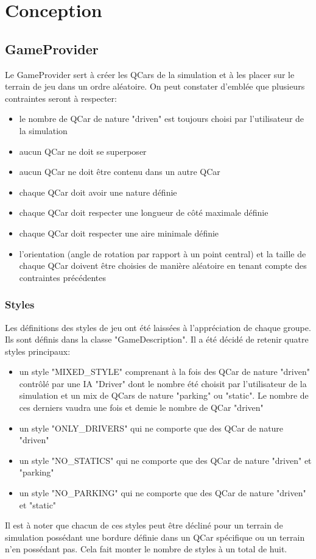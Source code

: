 \documentclass[a4paper, 12pt]{article}
\begin{document}
\section{Conception}
\subsection{GameProvider}
Le GameProvider sert à créer les QCars de la simulation et à les placer sur le terrain de jeu dans un ordre aléatoire. On peut constater d'emblée que plusieurs contraintes seront à respecter:
\begin{itemize}
 \item le nombre de QCar de nature "driven" est toujours choisi par l'utilisateur de la simulation
 \item aucun QCar ne doit se superposer
 \item aucun QCar ne doit être contenu dans un autre QCar
 \item chaque QCar doit avoir une nature définie
 \item chaque QCar doit respecter une longueur de côté maximale définie
 \item chaque QCar doit respecter une aire minimale définie
 \item l'orientation (angle de rotation par rapport à un point central) et la taille de chaque QCar doivent être choisies de manière aléatoire en tenant compte des contraintes précédentes
\end{itemize}

\subsubsection{Styles}
Les définitions des styles de jeu ont été laissées à l'appréciation de chaque groupe. Ils sont définis dans la classe "GameDescription". Il a été décidé de retenir quatre styles principaux:
\begin{itemize}
 \item un style "MIXED\_STYLE" comprenant à la fois des QCar de nature "driven" contrôlé par une IA "Driver" dont le nombre été choisit par l'utilisateur de la simulation et un mix de QCars de nature "parking" ou "static". Le nombre de ces derniers vaudra une fois et demie le nombre de QCar "driven"
 \item un style "ONLY\_DRIVERS" qui ne comporte que des QCar de nature "driven"
 \item un style "NO\_STATICS" qui ne comporte que des QCar de nature "driven" et "parking"
 \item un style "NO\_PARKING" qui ne comporte que des QCar de nature "driven" et "static"
\end{itemize}
Il est à noter que chacun de ces styles peut être décliné pour un terrain de simulation possédant une bordure définie dans un QCar spécifique ou un terrain n'en possédant pas. Cela fait monter le nombre de styles à un total de huit.
\end{document}
